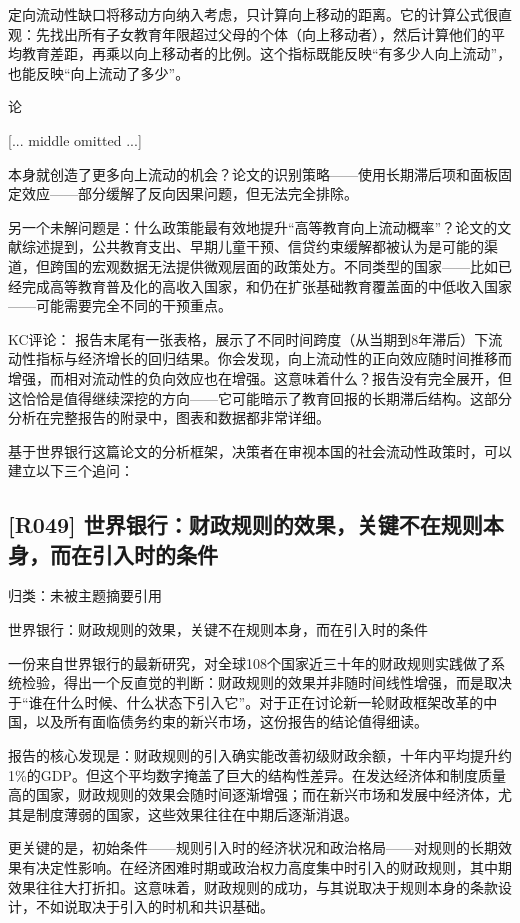 \documentclass[11pt]{ctexart}
\begin{document}
定向流动性缺口将移动方向纳入考虑，只计算向上移动的距离。它的计算公式很直观：先找出所有子女教育年限超过父母的个体（向上移动者），然后计算他们的平均教育差距，再乘以向上移动者的比例。这个指标既能反映“有多少人向上流动”，也能反映“向上流动了多少”。

论

[... middle omitted ...]

本身就创造了更多向上流动的机会？论文的识别策略——使用长期滞后项和面板固定效应——部分缓解了反向因果问题，但无法完全排除。

另一个未解问题是：什么政策能最有效地提升“高等教育向上流动概率”？论文的文献综述提到，公共教育支出、早期儿童干预、信贷约束缓解都被认为是可能的渠道，但跨国的宏观数据无法提供微观层面的政策处方。不同类型的国家——比如已经完成高等教育普及化的高收入国家，和仍在扩张基础教育覆盖面的中低收入国家——可能需要完全不同的干预重点。

KC评论： 报告末尾有一张表格，展示了不同时间跨度（从当期到8年滞后）下流动性指标与经济增长的回归结果。你会发现，向上流动性的正向效应随时间推移而增强，而相对流动性的负向效应也在增强。这意味着什么？报告没有完全展开，但这恰恰是值得继续深挖的方向——它可能暗示了教育回报的长期滞后结构。这部分分析在完整报告的附录中，图表和数据都非常详细。

基于世界银行这篇论文的分析框架，决策者在审视本国的社会流动性政策时，可以建立以下三个追问：

\subsection{[R049] 世界银行：财政规则的效果，关键不在规则本身，而在引入时的条件}
{\small\color{refgray}归类：未被主题摘要引用}

世界银行：财政规则的效果，关键不在规则本身，而在引入时的条件

一份来自世界银行的最新研究，对全球108个国家近三十年的财政规则实践做了系统检验，得出一个反直觉的判断：财政规则的效果并非随时间线性增强，而是取决于“谁在什么时候、什么状态下引入它”。对于正在讨论新一轮财政框架改革的中国，以及所有面临债务约束的新兴市场，这份报告的结论值得细读。

报告的核心发现是：财政规则的引入确实能改善初级财政余额，十年内平均提升约1\%的GDP。但这个平均数字掩盖了巨大的结构性差异。在发达经济体和制度质量高的国家，财政规则的效果会随时间逐渐增强；而在新兴市场和发展中经济体，尤其是制度薄弱的国家，这些效果往往在中期后逐渐消退。

更关键的是，初始条件——规则引入时的经济状况和政治格局——对规则的长期效果有决定性影响。在经济困难时期或政治权力高度集中时引入的财政规则，其中期效果往往大打折扣。这意味着，财政规则的成功，与其说取决于规则本身的条款设计，不如说取决于引入的时机和共识基础。
\end{document}
